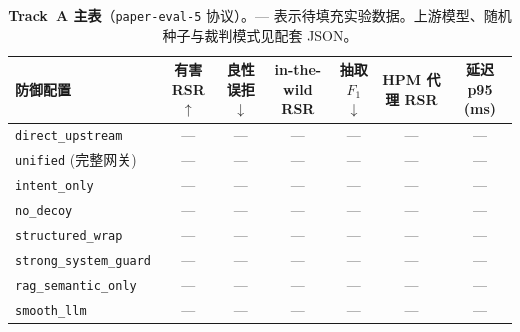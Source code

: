 \begin{table}[t]
\centering
\small
\setlength{\tabcolsep}{3pt}
\begin{tabular}{@{}lcccccc@{}}
\toprule
\textbf{防御配置} & \textbf{有害 RSR$\uparrow$} & \textbf{良性误拒$\downarrow$} & \textbf{in-the-wild RSR} & \textbf{抽取 $F_1$$\downarrow$} & \textbf{HPM 代理 RSR} & \textbf{延迟 p95 (ms)} \\
\midrule
\texttt{direct\_upstream} & --- & --- & --- & --- & --- & --- \\
\texttt{unified} (完整网关) & --- & --- & --- & --- & --- & --- \\
\texttt{intent\_only} & --- & --- & --- & --- & --- & --- \\
\texttt{no\_decoy} & --- & --- & --- & --- & --- & --- \\
\texttt{structured\_wrap} & --- & --- & --- & --- & --- & --- \\
\texttt{strong\_system\_guard} & --- & --- & --- & --- & --- & --- \\
\texttt{rag\_semantic\_only} & --- & --- & --- & --- & --- & --- \\
\texttt{smooth\_llm} & --- & --- & --- & --- & --- & --- \\
\bottomrule
\end{tabular}
\caption{\textbf{Track~A 主表}（\texttt{paper-eval-5} 协议）。--- 表示待填充实验数据。上游模型、随机种子与裁判模式见配套 JSON。}
\label{tab:tracka-main-cn}
\end{table}
